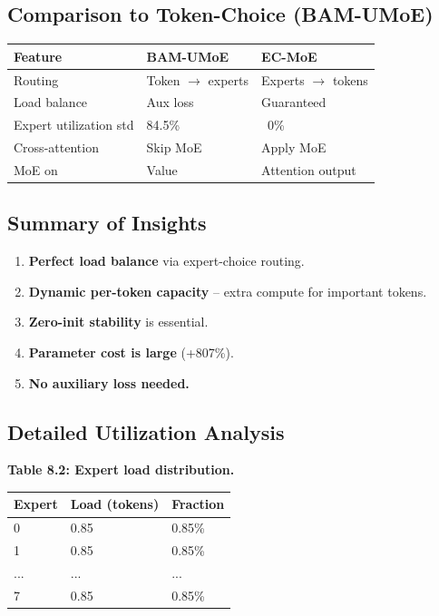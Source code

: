 \subsection{Comparison to Token-Choice (BAM-UMoE)}

\begin{table}[H]
\centering
\small
\begin{tabular}{lll}
\toprule
\textbf{Feature} & \textbf{BAM-UMoE} & \textbf{EC-MoE} \\
\midrule
Routing & Token $\to$ experts & Experts $\to$ tokens \\
Load balance & Aux loss & Guaranteed \\
Expert utilization std & 84.5\% & ~0\% \\
Cross-attention & Skip MoE & Apply MoE \\
MoE on & Value & Attention output \\
\bottomrule
\end{tabular}
\end{table}

\subsection{Summary of Insights}

\begin{enumerate}
\item \textbf{Perfect load balance} via expert-choice routing.
\item \textbf{Dynamic per-token capacity} -- extra compute for important tokens.
\item \textbf{Zero-init stability} is essential.
\item \textbf{Parameter cost is large} (+807\%).
\item \textbf{No auxiliary loss needed.}

\end{enumerate}
\subsection{Detailed Utilization Analysis}

\textbf{Table 8.2: Expert load distribution.}

\begin{table}[H]
\centering
\small
\begin{tabular}{lll}
\toprule
\textbf{Expert} & \textbf{Load (tokens)} & \textbf{Fraction} \\
\midrule
0 & 0.85 & 0.85\% \\
1 & 0.85 & 0.85\% \\
... & ... & ... \\
7 & 0.85 & 0.85\% \\
\bottomrule
\end{tabular}
\end{table}

